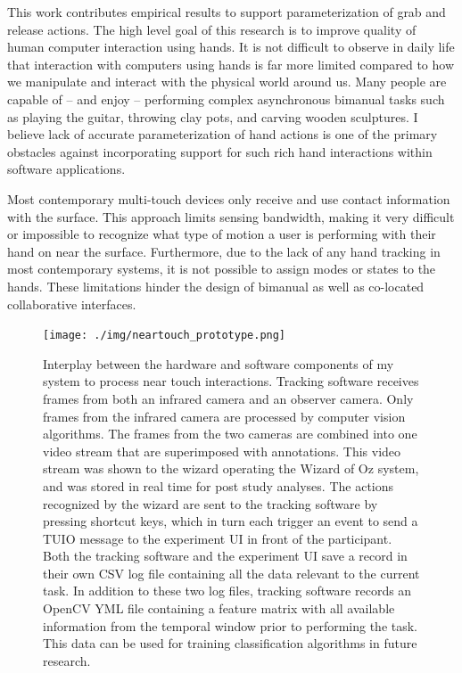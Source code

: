 \label{chapter:introduction}
This work contributes empirical results to support parameterization of grab and
release actions.
The high level goal of this research is to improve quality of human computer interaction using hands.
It is not difficult to observe in daily life that interaction with computers using hands is far more limited compared to how we manipulate and interact with the physical world around us.
Many people are capable of -- and enjoy -- performing complex asynchronous bimanual tasks such as playing the guitar, throwing clay pots, and carving wooden sculptures.
I believe lack of accurate parameterization of hand actions is one of the primary obstacles against incorporating support for such rich hand interactions within software applications.

Most contemporary multi-touch devices only receive and use contact information with the surface.  
This approach limits sensing bandwidth, making it very difficult or impossible to recognize what type of motion a user is performing with their hand on near the surface.  
Furthermore, due to the lack of any hand tracking in most contemporary systems, it is not possible to assign modes or states to the hands.  
These limitations hinder the design of bimanual as well as co-located collaborative interfaces.

\begin{figure}[t!]
 \centering
 \texttt{[image: ./img/neartouch\_prototype.png]}
 \caption[Interplay between the hardware and software components of my system to process near touch interactions.]{
Interplay between the hardware and software components of my system to process near touch interactions.
Tracking software receives frames from both an infrared camera and an observer camera.
Only frames from the infrared camera are processed by computer vision algorithms.
The frames from the two cameras are combined into one video stream that are superimposed with annotations.
This video stream was shown to the wizard operating the Wizard of Oz system, and was stored in real time for post study analyses.
The actions recognized by the wizard are sent to the tracking software by pressing shortcut keys, which in turn each trigger an event to send a TUIO message to the experiment UI in front of the participant.
Both the tracking software and the experiment UI save a record in their own CSV log file containing all the data relevant to the current task.
In addition to these two log files, tracking software records an OpenCV YML file containing a feature matrix with all available information from the temporal window prior to performing the task.
This data can be used for training classification algorithms in future research.
}
 \label{fig:neartouch_prototype}
\end{figure}

